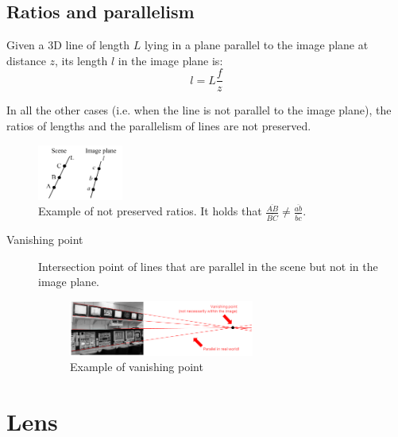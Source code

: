 \subsection{Ratios and parallelism}

Given a 3D line of length $L$ lying in a plane parallel to the image plane at distance $z$,
its length $l$ in the image plane is:
\[ l = L\frac{f}{z} \]

In all the other cases (i.e. when the line is not parallel to the image plane), 
the ratios of lengths and the parallelism of lines are not preserved.

\begin{figure}[H]
    \centering
    \includegraphics[width=0.25\textwidth]{./img/_perspective_projection_ratio.pdf}
    \caption{Example of not preserved ratios. It holds that $\frac{\overline{AB}}{\overline{BC}} \neq \frac{\overline{ab}}{\overline{bc}}$.}
\end{figure}

\begin{description}
    \item[Vanishing point] 
        Intersection point of lines that are parallel in the scene but not in the image plane.

        \begin{figure}[H]
            \centering
            \includegraphics[width=0.6\textwidth]{./img/_vanishing_point.pdf}
            \caption{Example of vanishing point}
        \end{figure}
\end{description}



\section{Lens}

